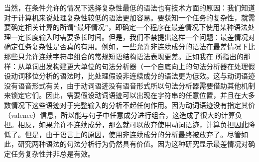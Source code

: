 当然，在条件允许的情况下选择复杂性最低的语法也有技术方面的原因：我们知道对于计算机来说处理复杂性较低的语法更加容易。要获知一个任务的复杂性，就需要确定相关计算的所谓“最坏情况”，即确定一个程序在最差情况下使用某种语法处理一定长度输入时需要多长时间。但是，我们不禁提出这样一个问题：最差情况对确定任务复杂性是否真的有用。例如，一些允许非连续成分的语法在最差情况下比那些只允许连续字符串组合的常规短语结构语法表现更差\citep[\S~8]{Reape91}。正如我在 所指出的那样：从单词出发构建更大单位的句法分析器（一个自底向上的句法分析器在处理假设动词移位分析的语法时，比处理假设非连续成分的语法更为低效。这与动词语迹没有语音形式有关，由于动词语迹没有语音形式所以句法分析器需要借助其他机制来锁定它们。因此，需要假设动词语迹可以出现在字符串的任意位置，并且在大多数情况下这些语迹对于完整输入的分析不起任何作用。因为动词语迹没有指定其价（valence）信息，所以能与句子中任意成分进行组合，这造成了很大的计算负担。相反，如果允许不连续成分，那么就可以放弃使用动词语迹，计算负担因此降低了。但是，由于语言上的原因，使用非连续成分的分析最终被放弃了\citep{Mueller2005c,Mueller2005d,MuellerLehrbuch1,MuellerGS}。尽管如此，研究两种语法的句法分析行为仍然具有价值。因为这种研究显示最差情况对确定任务复杂性并非总是有效。

